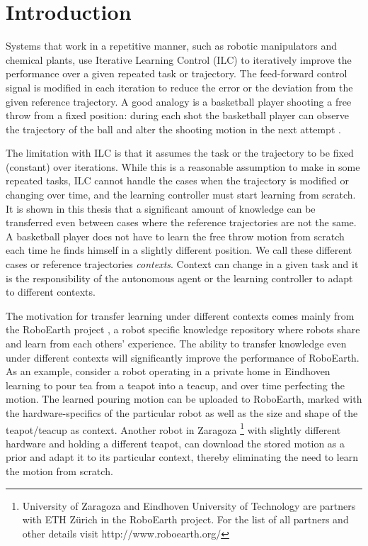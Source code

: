 \chapter{Introduction} \label{Introduction}

Systems that work in a repetitive manner, such as robotic manipulators and chemical plants, use Iterative Learning Control (ILC) to iteratively improve the performance over a given repeated task or trajectory. The feed-forward control signal is modified in each iteration to reduce the error or the deviation from the given reference trajectory. A good analogy is a basketball player shooting a free throw from a fixed position: during each shot the basketball player can observe the trajectory of the ball and alter the shooting motion in the next attempt \cite{Survey}. 

The limitation with ILC is that it assumes the task or the trajectory to be fixed (constant) over iterations. While this is a reasonable assumption to make in some repeated tasks, ILC cannot handle the cases when the trajectory is modified or changing over time, and the learning controller must start learning from scratch. It is shown in this thesis that a significant amount of knowledge can be transferred even between cases where the reference trajectories are not the same. A basketball player does not have to learn the free throw motion from scratch each time he finds himself in a slightly different position. We call these different cases or reference trajectories \textit{contexts}. Context can change in a given task and it is the responsibility of the autonomous agent or the learning controller to adapt to different contexts. 

The motivation for transfer learning under different contexts comes mainly from the RoboEarth project \cite{RoboEarth}, a robot specific knowledge repository where robots share and learn from each others' experience.  The ability to transfer knowledge even under different contexts will significantly improve the performance of RoboEarth.  As an example, consider a robot operating in a private home in Eindhoven learning to pour tea from a teapot into a teacup, and over time perfecting the motion. The learned pouring motion can be uploaded to RoboEarth, marked with the hardware-specifics of the particular robot as well as the size and shape of the teapot/teacup as context. Another robot in Zaragoza \footnote{University of Zaragoza and Eindhoven University of Technology are partners with ETH Z\" urich in the RoboEarth project. For the list of all partners and other details visit http://www.roboearth.org/} 
with slightly different hardware and holding a different teapot, can download the stored motion as a prior and adapt it to its particular context, thereby eliminating the need to learn the motion from scratch. 

